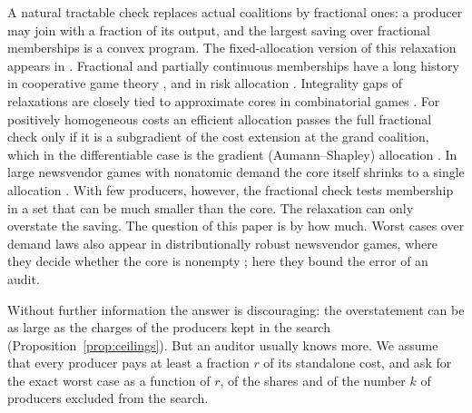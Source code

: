 \documentclass[11pt,a4paper]{article}
\theoremstyle{remark}
\begin{document}
A natural tractable check replaces actual coalitions by fractional ones: a
producer may join with a fraction of its output, and the largest saving over
fractional memberships is a convex program. The fixed-allocation version of
this relaxation appears in \citet[Section~5]{burer2005centralized}. Fractional
and partially continuous memberships have a long history in cooperative game
theory \citep{aubin1981fuzzy, samet1984dualcore, tijs2004fuzzy,
shellshear2009fuzzy}, and in risk allocation \citep{denault2001coherent,
csoka2009stable}. Integrality gaps of relaxations are closely tied to
approximate cores in combinatorial games \citep{deng1999algorithmic,
goemans2004facility, caprara2010costsharing}. For positively homogeneous costs
an efficient allocation passes the full fractional check only if it is a
subgradient of the cost extension at the grand coalition, which in the
differentiable case is the gradient (Aumann--Shapley) allocation
\citep{denault2001coherent, fischer2003onesided}. In large newsvendor games with
nonatomic demand the core itself shrinks to a single allocation
\citep{montrucchio2006large}. With few producers, however, the fractional check
tests membership in a set that can be much smaller than the core. The
relaxation can only overstate the saving. The question of this paper is by
how much. Worst cases over demand laws also appear in distributionally robust
newsvendor games, where they decide whether the core is nonempty
\citep{doan2020robust}; here they bound the error of an audit.

Without further information the answer is discouraging: the overstatement can
be as large as the charges of the producers kept in the search
(Proposition~\ref{prop:ceilings}). But an auditor usually knows more. We assume
that every producer pays at least a fraction $r$ of its standalone cost, and
ask for the exact worst case as a function of $r$, of the shares and of the
number $k$ of producers excluded from the search.
\end{document}
